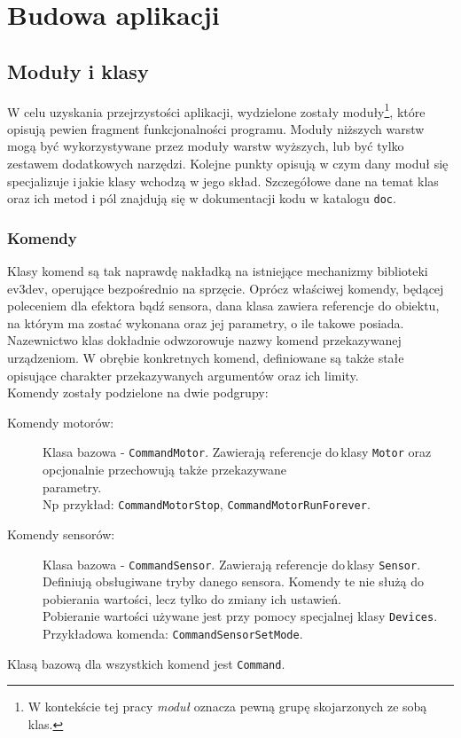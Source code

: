 \chapter{Budowa aplikacji}
\label{ch:budowa_aplikacji}

\section{Moduły i klasy}
\indent \indent W celu uzyskania przejrzystości aplikacji, wydzielone zostały moduły\footnote{W kontekście tej pracy \textit{moduł} oznacza pewną grupę skojarzonych ze sobą klas.}, które opisują pewien fragment funkcjonalności programu. Moduły niższych warstw mogą być wykorzystywane przez moduły warstw wyższych, lub być tylko zestawem dodatkowych narzędzi. Kolejne punkty opisują w czym dany moduł się specjalizuje i\,jakie klasy wchodzą w jego skład. Szczegółowe dane na temat klas oraz ich metod i pól znajdują się w dokumentacji kodu w katalogu {\tt doc}.

\subsection{Komendy}
\indent \indent Klasy komend są tak naprawdę nakładką na istniejące mechanizmy biblioteki ev3dev, operujące bezpośrednio na sprzęcie. Oprócz właściwej komendy, będącej poleceniem dla efektora bądź sensora, dana klasa zawiera referencje do obiektu, na którym ma zostać wykonana oraz jej parametry, o ile takowe posiada. Nazewnictwo klas dokładnie odwzorowuje nazwy komend przekazywanej urządzeniom. W obrębie konkretnych komend, definiowane są także stałe opisujące charakter przekazywanych argumentów oraz ich limity.\\
Komendy zostały podzielone na dwie podgrupy:
\begin{description}
    \item[Komendy motorów:] Klasa bazowa - {\tt CommandMotor}. Zawierają referencje do\,klasy {\tt Motor} oraz opcjonalnie przechowują także przekazywane\\parametry. \\Np przykład: {\tt CommandMotorStop}, {\tt CommandMotorRunForever}.

    \item[Komendy sensorów:] Klasa bazowa - {\tt CommandSensor}. Zawierają referencje do\,klasy {\tt Sensor}. Definiują obsługiwane tryby danego sensora. Komendy te nie służą do pobierania wartości, lecz tylko do zmiany ich ustawień.\\Pobieranie wartości używane jest przy pomocy specjalnej klasy {\tt Devices}. \\Przykładowa komenda: {\tt CommandSensorSetMode}.
\end{description}
Klasą bazową dla wszystkich komend jest {\tt Command}.

